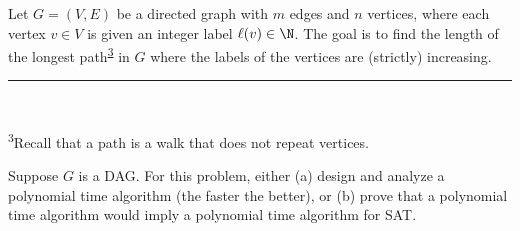 \documentclass{article}
\begin{document}
\setcounter{section}{12}
\setcounter{exercise}{10}

 Let $ G = (V, E) $ be a directed graph with $ m $ edges and $ n $ vertices, where each vertex $v \in V$ is given an integer label $\ell(v) \in\N$.
The goal is to find the length of the longest path\textsuperscript{\hyperref[fn:path]{3}} in $ G $ where the labels of the vertices are (strictly) increasing.\\
\noindent\rule{2in}{0.4pt} \\
\parbox{\linewidth}{\small \textsuperscript{\label{fn:path}3}Recall that a path is a walk that does not repeat vertices.}

\begin{subexercise}
  Suppose $G$ is a DAG. For this problem, either (a) design and analyze a polynomial time algorithm (the faster the better), or (b) prove that a polynomial time algorithm would imply a polynomial time algorithm for SAT.
\end{subexercise}
\end{document}
